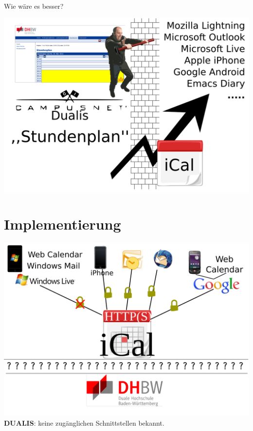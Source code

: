 \documentclass{beamer}
\begin{document}
\begin{frame}
  \begin{center}
    \Huge Wie wäre es besser?
  \end{center}
\end{frame}

\begin{frame}
\includegraphics[width=0.9\paperwidth]{images/overview-slide.png}
\end{frame}

\section{Implementierung}
\begin{frame}%
  \includegraphics[width=0.85\paperwidth]{images/schnittstellen.png}\\
  \textsc{\bf DUALIS}: keine zugänglichen Schnittstellen bekannt.
\end{frame}
\end{document}

